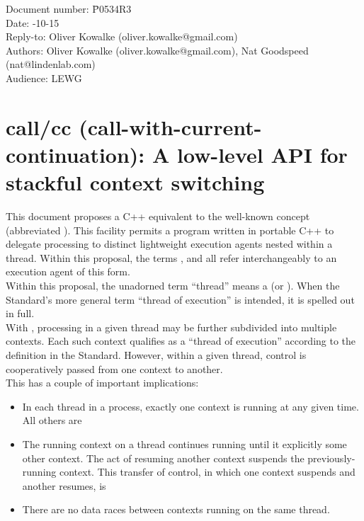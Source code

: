 \documentclass[fontsize=10pt,paper=A4,pagesize,DIV=15]{scrartcl}
\begin{document}
\small
\begin{tabbing}
    Document number: \= P0534R3\\
    Date:            -10-15\\
    Reply-to:        \> Oliver Kowalke (oliver.kowalke@gmail.com)\\
    Authors:         \> Oliver Kowalke (oliver.kowalke@gmail.com), Nat Goodspeed (nat@lindenlab.com)\\
    Audience:        \> LEWG\\
\end{tabbing}

\section*{call/cc (call-with-current-continuation): A low-level API for stackful context switching}


\tableofcontents


This document proposes a C++ equivalent to the well-known concept
 (abbreviated ). This
facility permits a program written in portable C++ to delegate processing to
distinct lightweight execution agents nested within a thread. Within this
proposal, the terms ,  and  all refer interchangeably to an execution agent of this form.\\

Within this proposal, the unadorned term ``thread'' means a 
(or ).
When the Standard's more general term ``thread of execution'' is intended, it
is spelled out in full.\\

With \cc, processing in a given thread may be further subdivided into multiple
contexts. Each such context qualifies as a ``thread of execution'' according
to the definition in the Standard. However, within a given thread, control is
cooperatively passed from one context to another.\\

This has a couple of important implications:

\begin{itemize}
\item In each thread in a process, exactly one context is running at any given
  time. All others are 
\item The running context on a thread continues running until it explicitly
   some other context. The act of resuming another context
  suspends the previously-running context. This transfer of control, in which
  one context suspends and another resumes, is 
\item There are no data races between contexts running on the same thread.
\end{itemize}
\end{document}
